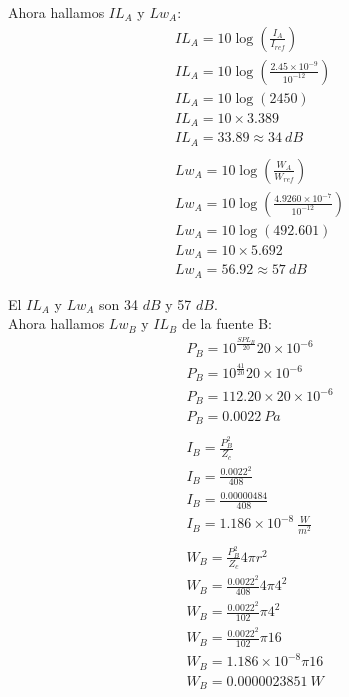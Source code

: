 \documentclass{article}
\begin{document}
Ahora hallamos $IL_A$ y $Lw_A$:
\begin{gather*}
    IL_A = 10 \log(\frac{I_A}{I_{ref}})\\
    IL_A = 10 \log(\frac{2.45 \times 10^{-9}}{10^{-12}})\\
    IL_A = 10 \log(2450)\\
    IL_A = 10 \times 3.389\\
    IL_A = 33.89 \approx 34\ dB\\\\
    Lw_A = 10 \log(\frac{W_A}{W_{ref}})\\
    Lw_A = 10 \log(\frac{4.9260 \times 10^{-7}}{10^{-12}})\\
    Lw_A = 10 \log(492.601)\\
    Lw_A = 10 \times 5.692\\
    Lw_A = 56.92 \approx 57\ dB
\end{gather*}

El $IL_A$ y $Lw_A$ son 34 $dB$ y 57 $dB$.\\

Ahora hallamos $Lw_B$ y $IL_B$ de la fuente B:
\begin{gather*}
    P_B = 10^{\frac{SPL_B}{20}} 20 \times 10^{-6}\\
    P_B = 10^{\frac{41}{20}} 20 \times 10^{-6}\\
    P_B = 112.20 \times 20 \times 10^{-6}\\
    P_B = 0.0022\ Pa\\\\
    I_B = \frac{P_B^2}{Z_c}\\
    I_B = \frac{0.0022^2}{408}\\
    I_B = \frac{0.00000484}{408}\\
    I_B = 1.186 \times 10^{-8}\ \frac{W}{m^2}\\\\
    W_B = \frac{P_B^2}{Z_c} 4\pi r^2\\
    W_B = \frac{0.0022^2}{408} 4\pi 4^2\\
    W_B = \frac{0.0022^2}{102} \pi 4^2\\
    W_B = \frac{0.0022^2}{102} \pi 16\\
    W_B = 1.186 \times 10^{-8} \pi 16\\
    W_B = 0.0000023851\ W
\end{gather*}
\end{document}
